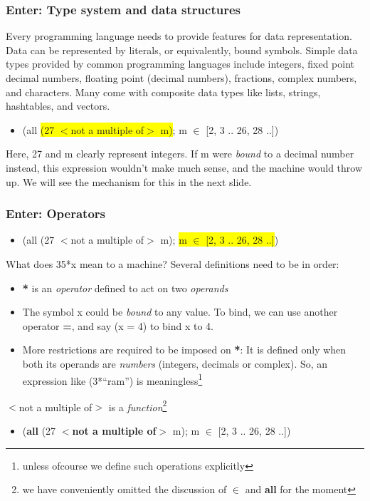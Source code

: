 \frame
{
  \frametitle{Enter: Type system and data structures}
  Every programming language needs to provide features for data representation. Data can be represented by literals, or equivalently, bound symbols. Simple data types provided by common programming languages include integers, fixed point decimal numbers, floating point (decimal numbers), fractions, complex numbers, and characters. Many come with composite data types like lists, strings, hashtables, and vectors.
  \begin{itemize}
    \item[] (all \colorbox{yellow}{(27 $<$not a multiple of$>$ m)}; m $\in$ [2, 3 .. 26, 28 ..])
  \end{itemize}
  Here, 27 and m clearly represent integers. If m were \textit{bound} to a decimal number instead, this expression wouldn't make much sense, and the machine would throw up. We will see the mechanism for this in the next slide.
}
\frame
{
  \frametitle{Enter: Operators}
  \begin{itemize}
    \item[] (all (27 $<$not a multiple of$>$ m); \colorbox{yellow}{m $\in$ [2, 3 .. 26, 28 ..]})
  \end{itemize}
  What does 35*x mean to a machine? Several definitions need to be in order:
  \begin{itemize}
    \item \textbf{*} is an \textit{operator} defined to act on two \textit{operands}
    \item The symbol x could be \textit{bound} to any value. To bind, we can use another operator \textbf{=}, and say (x = 4) to bind x to 4.
    \item More restrictions are required to be imposed on \textbf{*}: It is defined only when both its operands are \textit{numbers} (integers, decimals or complex). So, an expression like (3*``ram'') is meaningless\footnote{unless ofcourse we define such operations explicitly}
  \end{itemize}
  $<$not a multiple of$>$ is a \textit{function}\footnote{we have conveniently omitted the discussion of $\in$ and \textbf{all} for the moment}
  \begin{itemize}
    \item[] (\textbf{all} (27 \textbf{$<$not a multiple of$>$} m); m \textbf{$\in$} [2, 3 .. 26, 28 ..])
  \end{itemize}
}
\frame
